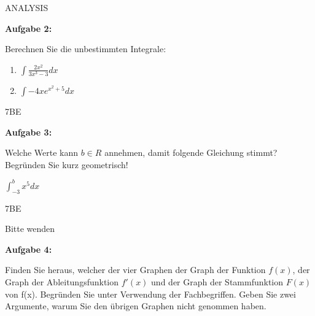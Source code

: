 \documentclass[a4paper,12pt]{article}
\newcommand{\Aufgabe}[1]{
  {
  \vspace*{0.5cm}
  \textsf{\textbf{Aufgabe #1}}
  \vspace*{0.2cm}
  
  }
}
\begin{document}
\vspace {0,2cm}
ANALYSIS

\Aufgabe{2:} 
Berechnen Sie die unbestimmten Integrale:

\begin{enumerate}[label={\alph*)}]
  \item $ \int \frac{2x^2}{3x^3-3} dx $
  \item $ \int -4xe^{x^2+5} dx $
\end{enumerate}
\begin{flushright}7BE \end{flushright}
\Aufgabe{3:}
Welche Werte kann $ b \in R$ annehmen, damit folgende Gleichung stimmt? Begründen Sie kurz geometrisch!

 $ \int_ {-3}^{b} x^5 dx $
\begin{flushright}7BE \end{flushright}
\begin{flushright}Bitte wenden \end{flushright}

\Aufgabe{4:}

Finden Sie heraus, welcher der vier Graphen der Graph der Funktion $f(x)$, der Graph der Ableitungsfunktion  $f'(x)$ und der Graph der Stammfunktion  $F(x)$ von f(x). Begründen Sie unter Verwendung der Fachbegriffen. Geben Sie zwei Argumente, warum Sie den übrigen  Graphen nicht genommen haben.
\end{document}
